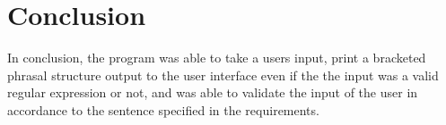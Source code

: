 \section*{Conclusion}
In conclusion, the program was able to take a users input, print a bracketed phrasal structure output to the user interface even if the the input was a valid regular expression or not, and was able to validate the input of the user in accordance to the sentence specified in the requirements.
